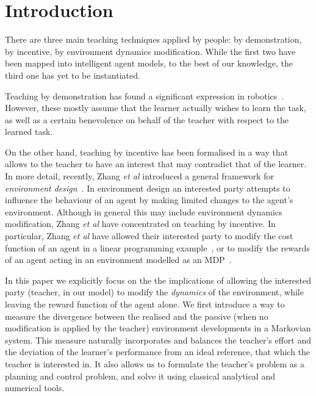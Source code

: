 

\section{Introduction}

There are three main teaching techniques applied by people: by
demonstration, by incentive, by environment dynamics
modification. While the
first two have been mapped into intelligent agent models, to the best
of our knowledge, the third one has yet to be instantiated.

Teaching by demonstration has found a significant expression in
robotics~\cite{argal_etal_2009}. However, these mostly assume that the
learner actually wishes to learn the task, as well as a certain
benevolence on behalf of the teacher with respect to the learned
task.

On the other hand, teaching by incentive has been formalised in a way
that allows to the teacher to have an interest that may contradict
that of the learner. In more detail, recently, Zhang \emph{et al}
introduced a general framework for \emph{environment
  design}~\cite{Zhang09:General}. In environment design an interested
party attempts to influence the behaviour of an agent by making limited
changes to the agent's environment. Although in general this may
include environment dynamics modification, Zhang \emph{et al} have
concentrated on teaching by incentive. In particular, Zhang \emph{et
  al} have allowed their interested party to modify the cost function
of an agent in a linear programming example~\cite{Zhang09:General}, or
to modify the rewards of an agent acting in an environment modelled as
an MDP~\cite{zhang_parkes_2008,Zhang09:Policy}.

In this paper we explicitly focus on the the implications of allowing
the interested party (teacher, in our model) to modify the
\emph{dynamics} of the environment, while leaving the reward function
of the agent alone. We first introduce a way to measure the divergence
between the realised and the passive (when no modification is applied
by the teacher) environment developments in a Markovian system. This
measure naturally incorporates and balances the teacher's effort and
the deviation of the learner's performance from an ideal reference,
that which the teacher is interested in. It also allows us to
formulate the teacher's problem as a planning and control problem, and
solve it using classical analytical and numerical tools.


